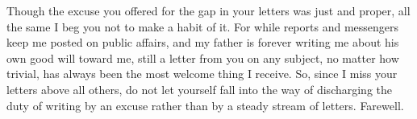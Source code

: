 

Though the excuse you offered for the gap in your letters was just and proper, all the same I beg you not to make a habit of it. For while reports and messengers keep me posted on public affairs, and my father is forever writing me about his own good will toward me, still a letter from you on any subject, no matter how trivial, has always been the most welcome thing I receive. So, since I miss your letters above all others, do not let yourself fall into the way of discharging the duty of writing by an excuse rather than by a steady stream of letters. Farewell.
